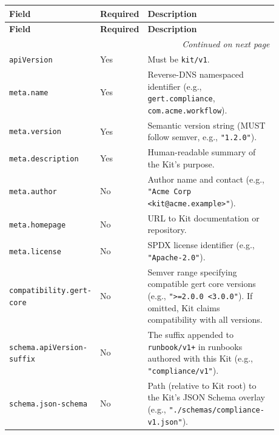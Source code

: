 \begin{longtable}{p{0.25\linewidth}p{0.12\linewidth}p{0.51\linewidth}}
\toprule
\textbf{Field} & \textbf{Required} & \textbf{Description} \\
\midrule
\endfirsthead

\toprule
\textbf{Field} & \textbf{Required} & \textbf{Description} \\
\midrule
\endhead

\midrule
\multicolumn{3}{r}{\footnotesize\itshape Continued on next page} \\
\bottomrule
\endfoot

\bottomrule
\endlastfoot

\texttt{apiVersion} & Yes & Must be \texttt{kit/v1}. \\

\texttt{meta.name} & Yes & Reverse-DNS namespaced identifier (e.g., \texttt{gert.compliance}, \texttt{com.acme.workflow}). \\

\texttt{meta.version} & Yes & Semantic version string (MUST follow semver, e.g., \texttt{"1.2.0"}). \\

\texttt{meta.description} & Yes & Human-readable summary of the Kit's purpose. \\

\texttt{meta.author} & No & Author name and contact (e.g., \texttt{"Acme Corp <kit@acme.example>"}). \\

\texttt{meta.homepage} & No & URL to Kit documentation or repository. \\

\texttt{meta.license} & No & SPDX license identifier (e.g., \texttt{"Apache-2.0"}). \\

\texttt{compatibility.gert-core} & No & Semver range specifying compatible gert core versions (e.g., \texttt{">=2.0.0 <3.0.0"}). If omitted, Kit claims compatibility with all versions. \\

\texttt{schema.apiVersion-suffix} & No & The suffix appended to \texttt{runbook/v1+} in runbooks authored with this Kit (e.g., \texttt{"compliance/v1"}). \\

\texttt{schema.json-schema} & No & Path (relative to Kit root) to the Kit's JSON Schema overlay (e.g., \texttt{"./schemas/compliance-v1.json"}). \\


\end{longtable}
